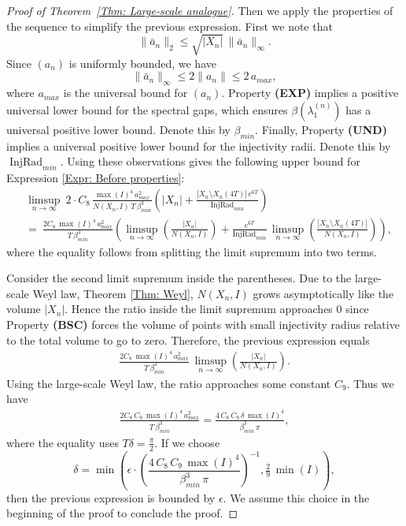 \documentclass[11pt,twoside,reqno]{amsart} \usepackage{a4wide} \usepackage[T1]{fontenc} \usepackage[utf8]{inputenc} \usepackage{soul}  \usepackage{amsmath} \usepackage{amsfonts} \usepackage{amssymb} \usepackage{mathtools} \usepackage{amsthm} \usepackage{xcolor} \usepackage{graphicx} \usepackage{hyperref} \usepackage{standalone} \usepackage{esint} \usepackage{comment} \usepackage[left=2.3cm,top=3cm,right=2.3cm]{geometry} \usepackage{bm} \usepackage{svg} \usepackage{float} \numberwithin{equation}{section} \theoremstyle{plain} \newtheorem{thm}{Theorem}[section] \newtheorem{theorem}[thm]{Theorem} \newtheorem*{theorem*}{Theorem}\newtheorem{conj}[thm]{Conjecture} \newtheorem{lemma}[thm]{Lemma} \newtheorem{prop}[thm]{Proposition} \newtheorem{proposition}[thm]{Proposition} \newtheorem{cor}[thm]{Corollary} \newtheorem{question}[thm]{Question} \newtheorem{corollary}[thm]{Corollary} \newtheorem{assumption}[thm]{Assumption} \theoremstyle{definition} \newtheorem{defn}[thm]{Definition} \newtheorem{choice}[thm]{Choice} \newtheorem{definition}[thm]{Definition} \newtheorem{ex}[thm]{Example} \newtheorem{notation}[thm]{Notation} \newtheorem*{ack}{Acknowledgements} \theoremstyle{remark} \newtheorem{remark}[thm]{Remark} \newtheorem{bigremark}[thm]{Remark} \usepackage{xcolor} \newcommand{\red}[1]{ {\color{Red}#1} } \newcommand{\blue}[1]{ {\color{Blue}#1} } \author{Kai Hippi} \address{Aalto University, Espoo, Finland} \email{kai.hippi@aalto.fi}
\begin{document}
\begin{proof}[Proof of Theorem~\ref{Thm: Large-scale analogue}]
Then we apply the properties of the sequence to simplify the previous expression. First we note that 
$$ \| \bar{a}_{n} \|_{2} \leq \sqrt{ | X_{n} | } \, \| \bar{a}_{n} \|_{\infty}. $$ 
Since $ ( a_{n} ) $ is uniformly bounded, we have 
$$ \| \bar{a}_{n} \|_{\infty} \leq 2 \| a_{n} \| \leq 2 \, a_{max}, $$
where $ a_{max} $ is the universal bound for $ ( a_{n} ) $.
Property \textbf{(EXP)} implies a positive universal lower bound for the spectral gaps, which ensures $ \beta( \lambda_{1}^{( n )} ) $ has a universal positive lower bound. Denote this by $ \beta_{min} $. Finally, Property \textbf{(UND)} implies a universal positive lower bound for the injectivity radii. Denote this by $ \operatorname{InjRad}_{min} $. Using these observations gives the following upper bound for Expression \eqref{Expr: Before properties}:
\begin{align*}
	&
	\limsup_{n \to \infty} \ 2 \cdot C_{8} \, \frac{ \max( I )^{4} \, a_{max}^{2} }{N( X_{n}, I ) \, T \, \beta_{min}^{3}  }\left( | X_{n} | + \frac{ | X_{n} \setminus X_{n}( 4T ) | \, e^{6T} }{ \operatorname{InjRad}_{min} } \right)
	\\
	& = \
	\frac{2 C_{8} \, \max( I )^{4} \, a_{max}^{2}  }{ T \, \beta_{min}^{3} }\left( \limsup_{n \to \infty} \left(  \frac{| X_{n} |}{ N( X_{n}, I ) } \right) +  \frac{ e^{6T} }{ \operatorname{InjRad}_{min} } \, \limsup_{n \to \infty}\left( \frac{ | X_{n} \setminus X_{n}( 4T ) | }{ N( X_{n}, I ) } \right) \right),	
\end{align*}
where the equality follows from splitting the limit supremum into two terms.

Consider the second limit supremum inside the parentheses. Due to the large-scale Weyl law, Theorem \ref{Thm: Weyl}, $ N( X_{n}, I ) $ grows asymptotically like the volume $ | X_{n} | $. Hence the ratio inside the limit supremum approaches $ 0 $ since Property \textbf{(BSC)} forces the volume of points with small injectivity radius relative to the total volume to go to zero. Therefore, the previous expression equals
\begin{align*}
	\frac{2 C_{8} \, \max( I )^{4} \, a_{max}^{2}  }{ T \, \beta_{min}^{3} } \, \limsup_{n \to \infty} \left(  \frac{| X_{n} |}{ N( X_{n}, I ) } \right).
\end{align*}
Using the large-scale Weyl law, the ratio approaches some constant $ C_{9} $. Thus we have
\begin{align*}
	\frac{2 C_{8} \, C_{9} \, \max( I )^{4} \, a_{max}^{2}  }{ T \, \beta_{min}^{3} }
	=
	\frac{4 \, C_{8} \, C_{9} \, \delta \, \max( I )^{4} }{ \beta_{min}^{3} \, \pi },
\end{align*}
where the equality uses $ T  \delta = \tfrac{\pi}{2} $. If we choose
$$ \delta =  \min \left( \epsilon \cdot \left( \frac{4 \, C_{8} \, C_{9} \, \max( I )^{4} }{ \beta_{min}^{3} \, \pi } \right)^{-1} , \tfrac{2}{9} \, \min( I )  \right),$$
then the previous expression is bounded by $ \epsilon $. We assume this choice in the beginning of the proof to conclude the proof.

\end{proof}
\end{document}
